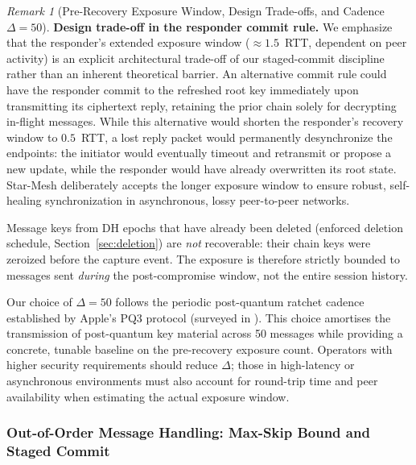 \documentclass[11pt,a4paper]{article}
\theoremstyle{remark}
\newtheorem{remark}[theorem]{Remark}
\theoremstyle{plain}
\begin{document}
\begin{remark}[Pre-Recovery Exposure Window, Design Trade-offs, and Cadence $\Delta = 50$]
\textbf{Design trade-off in the responder commit rule.}  We emphasize that the responder's extended exposure window ($\approx 1.5$~RTT, dependent on peer activity) is an explicit architectural trade-off of our staged-commit discipline rather than an inherent theoretical barrier.  An alternative commit rule could have the responder commit to the refreshed root key immediately upon transmitting its ciphertext reply, retaining the prior chain solely for decrypting in-flight messages.  While this alternative would shorten the responder's recovery window to $0.5$~RTT, a lost reply packet would permanently desynchronize the endpoints: the initiator would eventually timeout and retransmit or propose a new update, while the responder would have already overwritten its root state.  Star-Mesh deliberately accepts the longer exposure window to ensure robust, self-healing synchronization in asynchronous, lossy peer-to-peer networks.

Message keys from DH epochs that have already been deleted (enforced deletion schedule,
Section~\ref{sec:deletion}) are \emph{not} recoverable: their chain keys were zeroized
before the capture event.  The exposure is therefore strictly bounded to messages sent \emph{during}
the post-compromise window, not the entire session history.

Our choice of $\Delta = 50$ follows the periodic post-quantum ratchet cadence established by Apple's
PQ3 protocol \cite{imessage_pq3} (surveyed in \cite{dodis2025tripleratchet}).  This choice amortises
the transmission of post-quantum key material across 50 messages while providing a concrete,
tunable baseline on the pre-recovery exposure count.  Operators with higher security requirements
should reduce $\Delta$; those in high-latency or asynchronous environments must also account for
round-trip time and peer availability when estimating the actual exposure window.
\end{remark}

\subsubsection{Out-of-Order Message Handling: Max-Skip Bound and Staged Commit}
\label{sec:outoforder}
\end{document}
